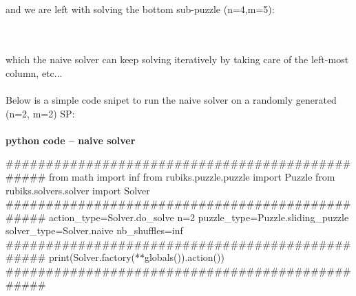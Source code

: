 \\
\begin{twentyfour}
\end{twentyfour}
%
\begin{twentyfour}
\end{twentyfour}
%
\begin{twentyfour}
\end{twentyfour}
\\
\begin{twentyfour}
\end{twentyfour}
%
\begin{twentyfour}
\end{twentyfour}
%
\begin{twentyfour}
\end{twentyfour}
\\
\\
and we are left with solving the bottom sub-puzzle (n=4,m=5):
\\
\begin{twenty}
\end{twenty}
\\
\\
which the naive solver can keep solving iteratively by taking care of the left-most column, etc...
\\
\\
Below is a simple code snipet to run the naive solver on a randomly generated (n=2, m=2) SP:
\afblue
\paragraph{}{\textbf{python code -- naive solver}}
\begin{python}
################################################
from math import inf
from rubiks.puzzle.puzzle import Puzzle
from rubiks.solvers.solver import Solver
################################################
action_type=Solver.do_solve
n=2
puzzle_type=Puzzle.sliding_puzzle
solver_type=Solver.naive
nb_shuffles=inf
################################################
print(Solver.factory(**globals()).action())
################################################
\end{python}
\black

